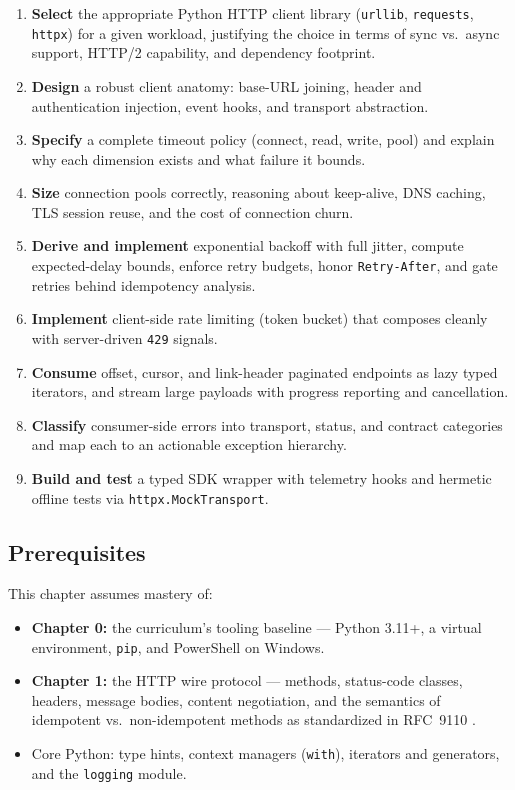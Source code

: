 \begin{enumerate}
  \item \textbf{Select} the appropriate Python HTTP client library
        (\texttt{urllib}, \texttt{requests}, \texttt{httpx}) for a given
        workload, justifying the choice in terms of sync vs.\ async support,
        HTTP/2 capability, and dependency footprint.
  \item \textbf{Design} a robust client anatomy: base-URL joining, header and
        authentication injection, event hooks, and transport abstraction.
  \item \textbf{Specify} a complete timeout policy (connect, read, write,
        pool) and explain why each dimension exists and what failure it
        bounds.
  \item \textbf{Size} connection pools correctly, reasoning about keep-alive,
        DNS caching, TLS session reuse, and the cost of connection churn.
  \item \textbf{Derive and implement} exponential backoff with full jitter,
        compute expected-delay bounds, enforce retry budgets, honor
        \texttt{Retry-After}, and gate retries behind idempotency analysis.
  \item \textbf{Implement} client-side rate limiting (token bucket) that
        composes cleanly with server-driven \texttt{429} signals.
  \item \textbf{Consume} offset, cursor, and link-header paginated endpoints
        as lazy typed iterators, and stream large payloads with progress
        reporting and cancellation.
  \item \textbf{Classify} consumer-side errors into transport, status, and
        contract categories and map each to an actionable exception hierarchy.
  \item \textbf{Build and test} a typed SDK wrapper with telemetry hooks and
        hermetic offline tests via \texttt{httpx.MockTransport}.
\end{enumerate}

\subsection{Prerequisites}

This chapter assumes mastery of:

\begin{itemize}
  \item \textbf{Chapter 0:} the curriculum's tooling baseline --- Python 3.11+,
        a virtual environment, \texttt{pip}, and PowerShell on Windows.
  \item \textbf{Chapter 1:} the HTTP wire protocol --- methods, status-code
        classes, headers, message bodies, content negotiation, and the
        semantics of idempotent vs.\ non-idempotent methods as standardized in
        RFC~9110 \cite{rfc9110}.
  \item Core Python: type hints, context managers (\texttt{with}), iterators
        and generators, and the \texttt{logging} module.
\end{itemize}

